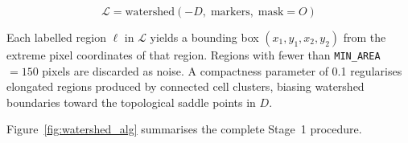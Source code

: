 \documentclass[10pt,twocolumn]{article}
\begin{document}
\begin{equation}
  \mathcal{L} = \text{watershed}(-D,\; \text{markers},\; \text{mask}=O)
  \label{eq:watershed}
\end{equation}

Each labelled region $\ell$ in $\mathcal{L}$ yields a bounding box
$(x_1, y_1, x_2, y_2)$ from the extreme pixel coordinates of that region.
Regions with fewer than \texttt{MIN\_AREA}~$= 150$ pixels are discarded
as noise. A compactness parameter of 0.1 regularises elongated regions
produced by connected cell clusters, biasing watershed boundaries toward
the topological saddle points in $D$.

Figure~\ref{fig:watershed_alg} summarises the complete Stage~1 procedure.

\begin{figure}[t]
\centering
{}
\end{figure}
\end{document}
